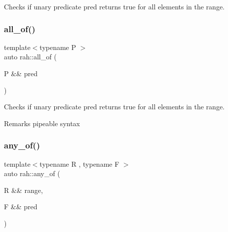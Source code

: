 Checks if unary predicate pred returns true for all elements in the range. 


\begin{DoxyCodeInclude}{0}
\DoxyCodeLine{    );}
\end{DoxyCodeInclude}
\mbox{\label{namespacerah_a4066165c960917a330beeed75a0f96e7}} 
\subsubsection{\texorpdfstring{all\_of()}{all\_of()}\hspace{0.1cm}{\footnotesize\ttfamily [2/2]}}
{\footnotesize\ttfamily template$<$typename P $>$ \\
auto rah\+::all\+\_\+of (\begin{DoxyParamCaption}\item[{P \&\&}]{pred }\end{DoxyParamCaption})}



Checks if unary predicate pred returns true for all elements in the range. 

\begin{DoxyRemark}{Remarks}
pipeable syntax
\end{DoxyRemark}

\begin{DoxyCodeInclude}{0}
\DoxyCodeLine{    ) == \textcolor{keyword}{false});}
\end{DoxyCodeInclude}
\mbox{\label{namespacerah_a025b40120fb932b244ae35963d7af203}} 
\subsubsection{\texorpdfstring{any\_of()}{any\_of()}\hspace{0.1cm}{\footnotesize\ttfamily [1/2]}}
{\footnotesize\ttfamily template$<$typename R , typename F $>$ \\
auto rah\+::any\+\_\+of (\begin{DoxyParamCaption}\item[{R \&\&}]{range,  }\item[{F \&\&}]{pred }\end{DoxyParamCaption})}



